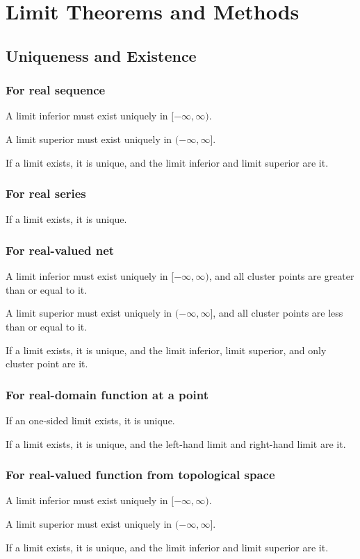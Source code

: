 \section{Limit Theorems and Methods}
\subsection{Uniqueness and Existence}
\subsubsection{For real sequence}
\bit
\item A limit inferior must exist uniquely in $[-\infty,\infty)$.
\item A limit superior must exist uniquely in $(-\infty,\infty]$.
\item If a limit exists, it is unique, and the limit inferior and limit superior are it.
\eit
\subsubsection{For real series}
If a limit exists, it is unique.
\subsubsection{For real-valued net}
\bit
\item A limit inferior must exist uniquely in $[-\infty,\infty)$, and all cluster points are greater than or equal to it.
\item A limit superior must exist uniquely in $(-\infty,\infty]$, and all cluster points are less than or equal to it.
\item If a limit exists, it is unique, and the limit inferior, limit superior, and only cluster point are it.
\eit
\subsubsection{For real-domain function at a point}
\bit
\item If an one-sided limit exists, it is unique.
\item If a limit exists, it is unique, and the left-hand limit and right-hand limit are it.
\eit
\subsubsection{For real-valued function from topological space}
\bit
\item A limit inferior must exist uniquely in $[-\infty,\infty)$.
\item A limit superior must exist uniquely in $(-\infty,\infty]$.
\item If a limit exists, it is unique, and the limit inferior and limit superior are it.
\eit
